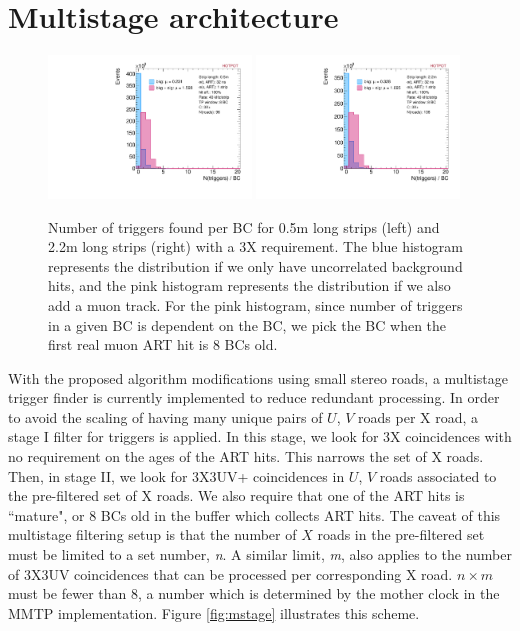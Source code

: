 \section{Multistage architecture}
\label{sec:multistage}

\begin{figure}[!htpb]
  \begin{center}
    \includegraphics[width=0.48\textwidth]{figures/small_3x0uv_ntrig_BC7.pdf}
    \includegraphics[width=0.48\textwidth]{figures/large_3x0uv_ntrig_BC7.pdf}
  \end{center}
  \vspace{-10pt}
  \caption{Number of triggers found per BC for 0.5m long strips (left) and 2.2m long strips (right) with a 3X requirement. The blue histogram represents the distribution if we only have uncorrelated background hits, and the pink histogram represents the distribution if we also add a muon track. For the pink histogram, since number of triggers in a given BC is dependent on the BC, we pick the BC when the first real muon ART hit is 8 BCs old.}
  \label{fig:3x_trig}
\end{figure}

With the proposed algorithm modifications using small stereo roads, a multistage trigger finder is currently implemented to reduce redundant processing. In order to avoid the scaling of having many unique pairs of $U$, $V$ roads per X road, a stage I filter for triggers is applied. In this stage, we look for 3X coincidences with no requirement on the ages of the ART hits. This narrows the set of X roads. Then, in stage II, we look for 3X3UV+ coincidences in $U$, $V$ roads associated to the pre-filtered set of X roads. We also require that one of the ART hits is ``mature", or 8 BCs old in the buffer which collects ART hits. The caveat of this multistage filtering setup is that the number of $X$ roads in the pre-filtered set must be limited to a set number, \textit{n}. A similar limit, \textit{m}, also applies to the number of 3X3UV coincidences that can be processed per corresponding X road. $n \times m$ must be fewer than 8, a number which is determined by the mother clock in the MMTP implementation. Figure \ref{fig:mstage} illustrates this scheme.

